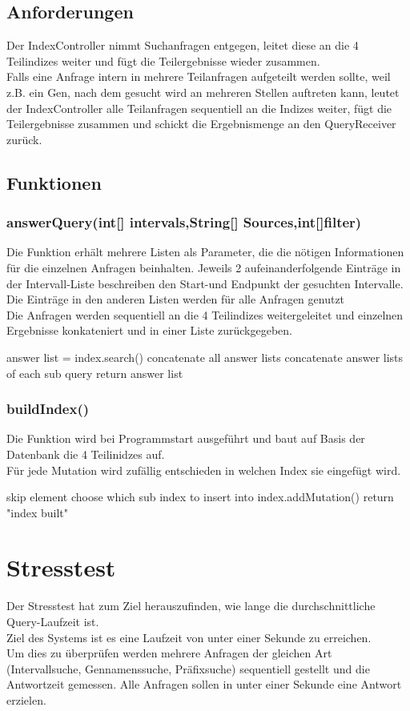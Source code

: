 \documentclass[]{article}
\begin{document}
\subsection{Anforderungen}
Der IndexController nimmt Suchanfragen entgegen, leitet diese an die 4 Teilindizes weiter und fügt die Teilergebnisse wieder zusammen.\\Falls eine Anfrage intern in mehrere Teilanfragen aufgeteilt werden sollte, weil z.B. ein Gen, nach dem gesucht wird an mehreren Stellen auftreten kann, leutet der IndexController alle Teilanfragen sequentiell an die Indizes weiter, fügt die Teilergebnisse zusammen und schickt die Ergebnismenge an den QueryReceiver zurück.
\subsection{Funktionen}
\subsubsection{answerQuery(int[] intervals,String[] Sources,int[]filter)}
Die Funktion erhält mehrere Listen als Parameter, die die nötigen Informationen für die einzelnen Anfragen beinhalten. Jeweils 2 aufeinanderfolgende Einträge in der Intervall-Liste beschreiben den Start-und Endpunkt der gesuchten Intervalle. Die Einträge in den anderen Listen werden für alle Anfragen genutzt\\
Die Anfragen werden sequentiell an die 4 Teilindizes weitergeleitet und einzelnen Ergebnisse konkateniert und in einer Liste zurückgegeben.
\begin{algorithm}
{
{answer list = index.search()\;}
concatenate all answer lists\;
}
concatenate answer lists of each sub query\;
return answer list\;
\end{algorithm}


\subsubsection{buildIndex()}
Die Funktion wird bei Programmstart ausgeführt und baut auf Basis der Datenbank die 4 Teilinidzes auf.\\
Für jede Mutation wird zufällig entschieden in welchen Index sie eingefügt wird.\\
\begin{algorithm}
{
{skip element\;}
choose which sub index to insert into\;
index.addMutation()\;
}
return "index built"\;
\end{algorithm}

\newpage
\section{Stresstest}
Der Stresstest hat zum Ziel herauszufinden, wie lange die durchschnittliche Query-Laufzeit ist.\\
Ziel des Systems ist es eine Laufzeit von unter einer Sekunde zu erreichen.\\
Um dies zu überprüfen werden mehrere Anfragen der gleichen Art (Intervallsuche, Gennamenssuche, Präfixsuche) sequentiell gestellt und die Antwortzeit gemessen. Alle Anfragen sollen in unter einer Sekunde eine Antwort erzielen.
\end{document}
